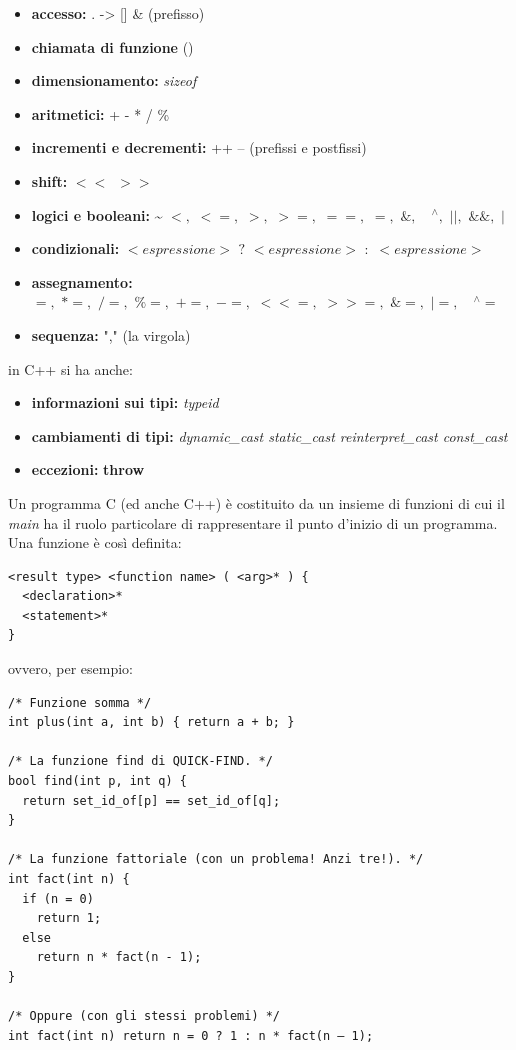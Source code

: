 \documentclass[a4paper,12pt, oneside]{book}
\begin{document}
\begin{itemize}
\item \textbf{accesso:} . -> [] \& (prefisso)
\item \textbf{chiamata di funzione} ()
\item \textbf{dimensionamento:} \textit{sizeof}
\item \textbf{aritmetici:} + - * / \%
\item \textbf{incrementi e decrementi:} ++ -- (prefissi e postfissi)
\item \textbf{shift:} $<<\,\,\,>>$
\item \textbf{logici e booleani:} \~ \! $<,\,\,<=,\,\,>,\,\,>=,\,\,==,\,\,=,\,\, \&,\,\, \mbox{ }^{\wedge},\,\, ||,\,\, \&\&,\,\, |$
\item \textbf{condizionali:} $<espressione>\,\, ?\,\,<espressione>\,\, :\,\, <espressione>$
\item \textbf{assegnamento:} $=,\,\,*=,\,\,/=,\,\,\%=,\,\,+=,\,\,-=,\,\,<<=,\,\,>>=,\,\,\&=,\,\,|=,\,\,\mbox{ }^{\wedge}=$
\item \textbf{sequenza:} "," (la virgola)
\end{itemize}
in C++ si ha anche:
\begin{itemize}
\item \textbf{informazioni sui tipi:} \textit{typeid}
\item \textbf{cambiamenti di tipi:} \textit{dynamic\_cast static\_cast reinterpret\_cast
const\_cast}
\item \textbf{eccezioni:} \textbf{throw}
\end{itemize}
Un programma C (ed anche C++) è costituito da un insieme di
funzioni di cui il \textit{main} ha il ruolo particolare di
rappresentare il punto d'inizio di un programma. Una funzione è così definita:
\begin{verbatim}
<result type> <function name> ( <arg>* ) {
  <declaration>*
  <statement>*
}
\end{verbatim}
ovvero, per esempio:
\begin{verbatim}
/* Funzione somma */
int plus(int a, int b) { return a + b; }

/* La funzione find di QUICK-FIND. */
bool find(int p, int q) {
  return set_id_of[p] == set_id_of[q];
}

/* La funzione fattoriale (con un problema! Anzi tre!). */
int fact(int n) {
  if (n = 0)
    return 1;
  else
    return n * fact(n - 1);
}

/* Oppure (con gli stessi problemi) */
int fact(int n) return n = 0 ? 1 : n * fact(n – 1);
\end{verbatim}
\end{document}
